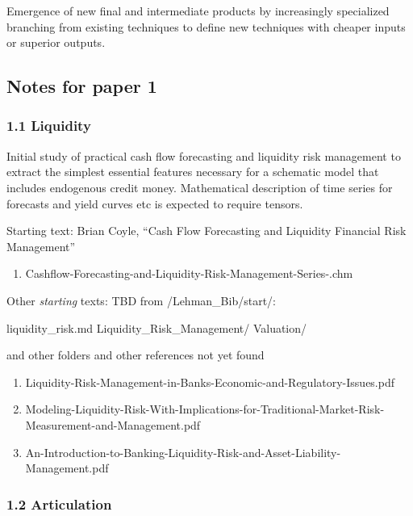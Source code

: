 \documentclass{article}
\begin{document}
Emergence of new final and intermediate products by increasingly
specialized branching from existing techniques to define new techniques
with cheaper inputs or superior outputs.

\hypertarget{notes-for-paper-1}{%
\subsection{Notes for paper 1}\label{notes-for-paper-1}}

\hypertarget{liquidity}{%
\subsubsection{1.1 Liquidity}\label{liquidity}}

Initial study of practical cash flow forecasting and liquidity risk
management to extract the simplest essential features necessary for a
schematic model that includes endogenous credit money. Mathematical
description of time series for forecasts and yield curves etc is
expected to require tensors.

Starting text: Brian Coyle, ``Cash Flow Forecasting and Liquidity
Financial Risk Management''

\begin{enumerate}
\def\labelenumi{\arabic{enumi}.}
\tightlist
\item
  Cashflow-Forecasting-and-Liquidity-Risk-Management-Series-.chm
\end{enumerate}

Other \emph{starting} texts: TBD from /Lehman\_Bib/start/:

liquidity\_risk.md Liquidity\_Risk\_Management/ Valuation/

and other folders and other references not yet found

\begin{enumerate}
\def\labelenumi{\arabic{enumi}.}
\setcounter{enumi}{1}
\item
  Liquidity-Risk-Management-in-Banks-Economic-and-Regulatory-Issues.pdf
\item
  Modeling-Liquidity-Risk-With-Implications-for-Traditional-Market-Risk-Measurement-and-Management.pdf
\item
  An-Introduction-to-Banking-Liquidity-Risk-and-Asset-Liability-Management.pdf
\end{enumerate}

\hypertarget{articulation}{%
\subsubsection{1.2 Articulation}\label{articulation}}
\end{document}
